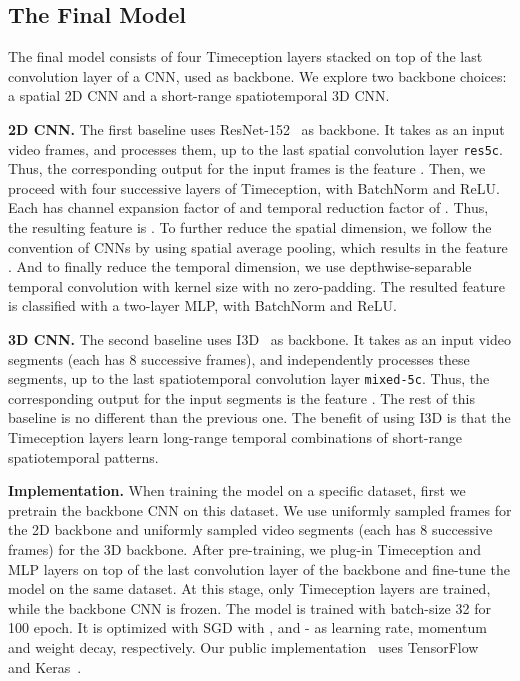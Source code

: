 \documentclass[10pt,twocolumn,letterpaper]{article}
\newcommand{\partitle}[1]{\noindent\textbf{#1}}
\begin{document}
\subsection{The Final Model}
The final model consists of four Timeception layers stacked on top of the last convolution layer of a CNN, used as backbone.
We explore two backbone choices: a spatial 2D CNN and a short-range spatiotemporal 3D CNN.

\partitle{2D CNN.}
The first baseline uses ResNet-152~\cite{he2016deep} as backbone.
It takes as an input  video frames, and processes them, up to the last spatial convolution layer \texttt{res5c}.
Thus, the corresponding output for the input frames is the feature .
Then, we proceed with four successive layers of Timeception, with BatchNorm and ReLU.
Each has channel expansion factor of  and temporal reduction factor of .
Thus, the resulting feature is .
To further reduce the spatial dimension, we follow the convention of CNNs by using spatial average pooling, which results in the feature .
And to finally reduce the temporal dimension, we use depthwise-separable temporal convolution with kernel size  with no zero-padding.
The resulted feature  is classified with a two-layer MLP, with BatchNorm and ReLU.

\partitle{3D CNN.}
The second baseline uses I3D~\cite{carreira2017quo} as backbone.
It takes as an input  video segments (each has 8 successive frames), and independently processes these segments, up to the last spatiotemporal convolution layer \texttt{mixed-5c}.
Thus, the corresponding output for the input segments is the feature .
The rest of this baseline is no different than the previous one.
The benefit of using I3D is that the Timeception layers learn long-range temporal combinations of short-range spatiotemporal patterns.

\partitle{Implementation.}
When training the model on a specific dataset, first we pretrain the backbone CNN on this dataset.
We use uniformly sampled frames for the 2D backbone and uniformly sampled video segments (each has 8 successive frames) for the 3D backbone.
After pre-training, we plug-in Timeception and MLP layers on top of the last convolution layer of the backbone and fine-tune the model on the same dataset.
At this stage, only Timeception layers are trained, while the backbone CNN is frozen.
The model is trained with batch-size 32 for 100 epoch.
It is optimized with SGD with ,  and - as learning rate, momentum and weight decay, respectively.
Our public implementation~\cite{timeceptioncode} uses TensorFlow~\cite{tensorflow2015-whitepaper} and Keras~\cite{chollet2015keras}.
\end{document}
